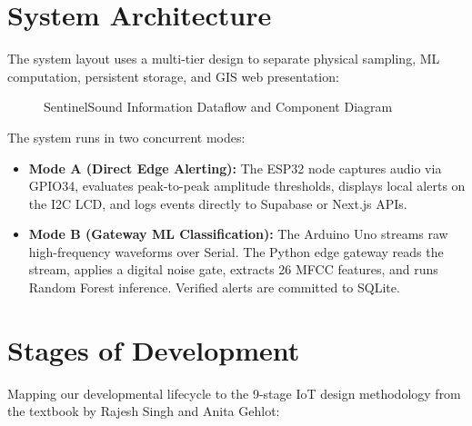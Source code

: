 \documentclass[11pt,a4paper]{article}
\begin{document}
\newpage

\section{System Architecture}
The system layout uses a multi-tier design to separate physical sampling, ML computation, persistent storage, and GIS web presentation:

\begin{figure}[H]
    \centering
    \caption{SentinelSound Information Dataflow and Component Diagram}
\end{figure}

The system runs in two concurrent modes:
\begin{itemize}
    \item \textbf{Mode A (Direct Edge Alerting):} The ESP32 node captures audio via GPIO34, evaluates peak-to-peak amplitude thresholds, displays local alerts on the I2C LCD, and logs events directly to Supabase or Next.js APIs.
    \item \textbf{Mode B (Gateway ML Classification):} The Arduino Uno streams raw high-frequency waveforms over Serial. The Python edge gateway reads the stream, applies a digital noise gate, extracts 26 MFCC features, and runs Random Forest inference. Verified alerts are committed to SQLite.
\end{itemize}

\section{Stages of Development}
Mapping our developmental lifecycle to the 9-stage IoT design methodology from the textbook by Rajesh Singh and Anita Gehlot:
\end{document}
